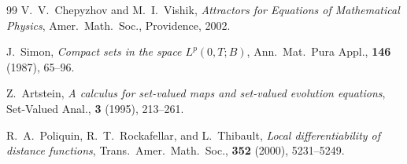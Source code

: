 \documentclass[12pt,a4paper]{article}
\theoremstyle{definition}
\theoremstyle{plain}
\theoremstyle{remark}
\begin{document}
\begin{thebibliography}{99}
V.~V.~Chepyzhov and M.~I.~Vishik, \textit{Attractors for Equations of Mathematical Physics}, Amer.\ Math.\ Soc., Providence, 2002.

J.~Simon, \textit{Compact sets in the space $L^p(0,T;B)$}, Ann.\ Mat.\ Pura Appl., \textbf{146} (1987), 65--96.

Z.~Artstein, \textit{A calculus for set-valued maps and set-valued evolution equations}, Set-Valued Anal., \textbf{3} (1995), 213--261.

R.~A.~Poliquin, R.~T.~Rockafellar, and L.~Thibault, \textit{Local differentiability of distance functions}, Trans.\ Amer.\ Math.\ Soc., \textbf{352} (2000), 5231--5249.

\end{thebibliography}
\end{document}
